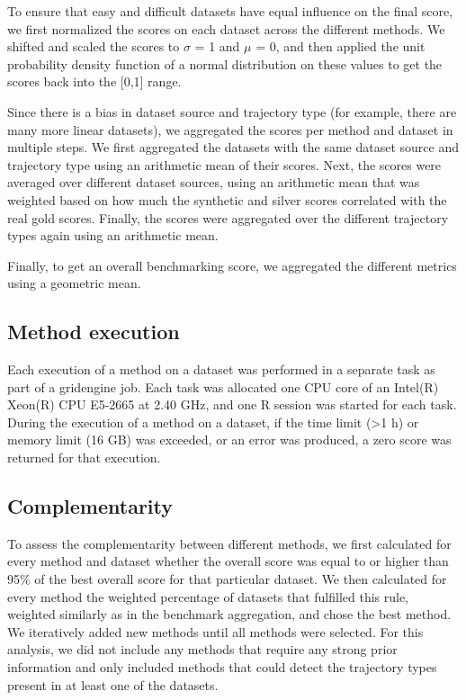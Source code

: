 To ensure that easy and difficult datasets have equal influence on the final score, we first normalized the scores on each dataset across the different methods. We shifted and scaled the scores to $\sigma$ = 1 and $\mu$ = 0, and then applied the unit probability density function of a normal distribution on these values to get the scores back into the [0,1] range.

Since there is a bias in dataset source and trajectory type (for example, there are many more linear datasets), we aggregated the scores per method and dataset in multiple steps. We first aggregated the datasets with the same dataset source and trajectory type using an arithmetic mean of their scores. Next, the scores were averaged over different dataset sources, using an arithmetic mean that was weighted based on how much the synthetic and silver scores correlated with the real gold scores. Finally, the scores were aggregated over the different trajectory types again using an arithmetic mean.

Finally, to get an overall benchmarking score, we aggregated the different metrics using a geometric mean.

\subsection{Method execution}

Each execution of a method on a dataset was performed in a separate task as part of a gridengine job. Each task was allocated one CPU core of an Intel(R) Xeon(R) CPU E5-2665 at 2.40 GHz, and one R session was started for each task. During the execution of a method on a dataset, if the time limit (>1 h) or memory limit (16 GB) was exceeded, or an error was produced, a zero score was returned for that execution.

\subsection{Complementarity}

To assess the complementarity between different methods, we first calculated for every method and dataset whether the overall score was equal to or higher than 95$\%$ of the best overall score for that particular dataset. We then calculated for every method the weighted percentage of datasets that fulfilled this rule, weighted similarly as in the benchmark aggregation, and chose the best method. We iteratively added new methods until all methods were selected. For this analysis, we did not include any methods that require any strong prior information and only included methods that could detect the trajectory types present in at least one of the datasets.

